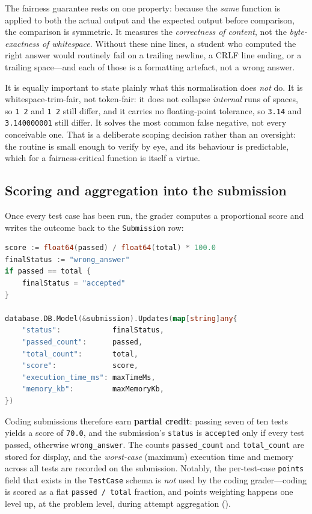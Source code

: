 The fairness guarantee rests on one property: because the \emph{same} function is applied to
both the actual output and the expected output before comparison, the comparison is symmetric.
It measures the \emph{correctness of content}, not the \emph{byte-exactness of whitespace}.
Without these nine lines, a student who computed the right answer would routinely fail on a
trailing newline, a CRLF line ending, or a trailing space---and each of those is a formatting
artefact, not a wrong answer.

It is equally important to state plainly what this normalisation does \emph{not} do. It is
whitespace-trim-fair, not token-fair: it does not collapse \emph{internal} runs of spaces, so
\texttt{1  2} and \texttt{1 2} still differ, and it carries no floating-point tolerance, so
\texttt{3.14} and \texttt{3.140000001} still differ. It solves the most common false negative,
not every conceivable one. That is a deliberate scoping decision rather than an oversight: the
routine is small enough to verify by eye, and its behaviour is predictable, which for a
fairness-critical function is itself a virtue.

\subsection{Scoring and aggregation into the submission}\label{sec:grading-score}

Once every test case has been run, the grader computes a proportional score and writes the
outcome back to the \texttt{Submission} row:

\begin{lstlisting}[language=Go,caption={Coding score and final submission update (\texttt{grader.go}).},label={lst:grade-score}]
score := float64(passed) / float64(total) * 100.0
finalStatus := "wrong_answer"
if passed == total {
	finalStatus = "accepted"
}

database.DB.Model(&submission).Updates(map[string]any{
	"status":            finalStatus,
	"passed_count":      passed,
	"total_count":       total,
	"score":             score,
	"execution_time_ms": maxTimeMs,
	"memory_kb":         maxMemoryKb,
})
\end{lstlisting}

Coding submissions therefore earn \textbf{partial credit}: passing seven of ten tests yields a
score of \texttt{70.0}, and the submission's \texttt{status} is \texttt{accepted} only if every
test passed, otherwise \texttt{wrong\_answer}. The counts \texttt{passed\_count} and
\texttt{total\_count} are stored for display, and the \emph{worst-case} (maximum) execution time
and memory across all tests are recorded on the submission. Notably, the per-test-case
\texttt{points} field that exists in the \texttt{TestCase} schema is \emph{not} used by the
coding grader---coding is scored as a flat \texttt{passed / total} fraction, and points
weighting happens one level up, at the problem level, during attempt aggregation
().

